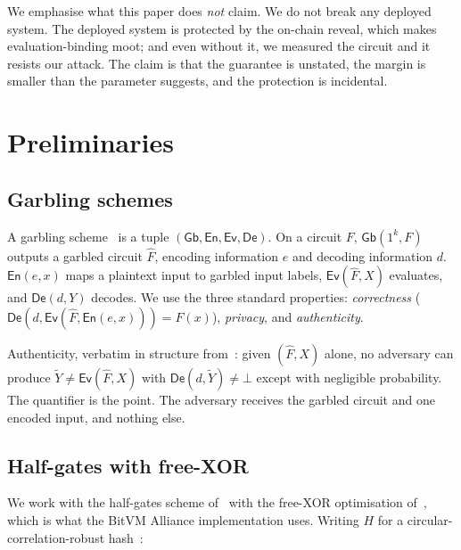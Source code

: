 \documentclass[11pt,a4paper]{article}
\theoremstyle{definition}
\theoremstyle{plain}
\newcommand{\Gb}{\mathsf{Gb}}
\newcommand{\En}{\mathsf{En}}
\newcommand{\Ev}{\mathsf{Ev}}
\newcommand{\De}{\mathsf{De}}
\newcommand{\Hh}{H}
\begin{document}
We emphasise what this paper does \emph{not} claim. We do not break any deployed
system. The deployed system is protected by the on-chain reveal, which makes
evaluation-binding moot; and even without it, we measured the circuit and it
resists our attack. The claim is that the guarantee is unstated, the margin is
smaller than the parameter suggests, and the protection is incidental.

\section{Preliminaries}

\subsection{Garbling schemes}

A garbling scheme~\cite{BHR12} is a tuple $(\Gb, \En, \Ev, \De)$. On a circuit
$F$, $\Gb(1^{k}, F)$ outputs a garbled circuit $\hat F$, encoding information
$e$ and decoding information $d$. $\En(e, x)$ maps a plaintext input to garbled
input labels, $\Ev(\hat F, X)$ evaluates, and $\De(d, Y)$ decodes. We use the
three standard properties: \emph{correctness}
($\De(d,\Ev(\hat F,\En(e,x))) = F(x)$), \emph{privacy}, and \emph{authenticity}.

Authenticity, verbatim in structure from~\cite{ZRE15}: given $(\hat F, X)$
alone, no adversary can produce $\tilde Y \ne \Ev(\hat F, X)$ with
$\De(d, \tilde Y) \ne \bot$ except with negligible probability. The quantifier is
the point. The adversary receives the garbled circuit and one encoded input, and
nothing else.

\subsection{Half-gates with free-XOR}
\label{sec:zre}

We work with the half-gates scheme of~\cite{ZRE15} with the free-XOR
optimisation of~\cite{KS08}, which is what the BitVM Alliance implementation
uses. Writing $\Hh$ for a circular-correlation-robust hash~\cite{GKWY20}:
\end{document}
